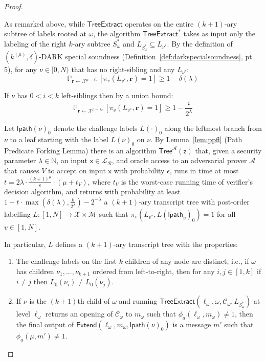 \begin{proof}
\begin{itemize}
\end{itemize}
As remarked above, while $\textsf{TreeExtract}$ operates on the entire $(k+1)$-ary subtree of labels rooted at $\omega$, the algorithm $\textsf{TreeExtract}^*$ takes as input only the labeling of the right $k$-ary subtree $S^*_\omega$ and $L_{S^*_\omega} \subseteq L_{\nu^*}$. 
By the definition of $(k^{(\mu)}, \delta)$-DARK special soundness (Definition~\ref{def:darkspecialsoundness}, pt. 5), for any $\nu \in [0,N)$ that has no right-sibling and any $L_{\nu^*}$: 
$$\mathbb{P}_{\mathbf{r} \leftarrow \mathcal{X}^{\mu - \ell_\nu}}[ \pi_v(L_{v^*}, \mathbf{r}) = 1 ] \geq 1 - \delta(\lambda)$$  

If $\nu$ has $0 < i < k$ left-siblings then by a union bound: 
$$\mathbb{P}_{\mathbf{r} \leftarrow \mathcal{X}^{\mu - \ell_\nu}}[ \pi_v(L_{v^*}, \mathbf{r}) = 1 ] \geq 1 - \frac{i}{2^\lambda} $$ 

Let $\textsf{lpath}(\nu)_0$ denote the challenge labels $L(\cdot)_0$ along the leftmost branch from $\nu$ to a leaf starting with the label $L(\nu)_0$ on $\nu$. By Lemma~\ref{lem:ppfl} (Path Predicate Forking Lemma) there is an algorithm $\textsf{Tree}^\mathcal{A}(\mathsf{z})$ that, given a security parameter $\lambda \in \mathbb{N}$, an input $\mathsf{x} \in \mathcal{L}_\mathcal{R}$, and oracle access to an adversarial prover $\mathcal{A}$ that causes $V$ to accept on input $\mathsf{x}$ with probability $\epsilon$, runs in time at most $t = 2\lambda \cdot \frac{(k+1)^\mu}{\epsilon} \cdot (\mu + t_V)$, where $t_V$ is the worst-case running time of verifier's decision algorithm, and returns with probability at least $1 - t \cdot \max(\delta(\lambda), \frac{k}{2^\lambda}) - 2^{-\lambda}$ a $(k+1)$-ary transcript tree with post-order labelling $L:[1,N] \rightarrow \mathcal{X}\times \mathcal{M}$ such that $\pi_v(L_{v^*}, L(\textsf{lpath}_v)_0) = 1$ for all $v \in [1,N]$. 


 In particular, $L$ defines a $(k+1)$-ary transcript tree with the properties: 
\begin{enumerate}
\item The challenge labels on the first $k$ children of any node are distinct, i.e., if $\omega$ has children $\nu_1,...,\nu_{k+1}$ ordered from left-to-right, then for any $i, j \in [1, k]$ if $i \neq j$ then $L_0(\nu_i) \neq L_0(\nu_j)$. 
\item  If $\nu$ is the $(k+1)$th child of $\omega$ and running $\textsf{TreeExtract}(\ell_\omega, \omega, \mathcal{C}_\omega, L_{S^*_\omega})$ at level $\ell_\omega$ returns an opening of $\mathcal{C}_\omega$ to $m_\omega$ such that $\phi_a(\ell_\omega, m_\omega) \neq 1$, then the final output of $\textsf{Extend}(\ell_\omega, m_\omega, \textsf{lpath}(\nu)_0)$ is a message $m'$ such that $\phi_a(\mu, m') \neq 1$. 
\end{enumerate} 


\end{proof}
